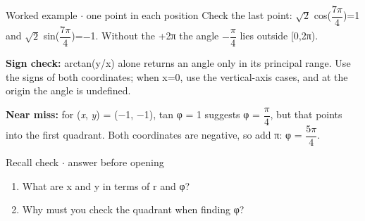 \documentclass[11pt]{article}
\begin{document}
\begin{keepsection}
\begin{workedbox}{Worked example \ensuremath{\cdot} one point in each position}
Check the last point: \ensuremath{\sqrt{2}} cos({\small\ensuremath{\dfrac{7π}{4}}})=1 and \ensuremath{\sqrt{2}} sin({\small\ensuremath{\dfrac{7π}{4}}})=\ensuremath{-}1. Without the +2π the angle \ensuremath{-}{\small\ensuremath{\dfrac{π}{4}}} lies outside [0,2π).
\end{workedbox}

\begin{notebox}\textbf{Sign check:} arctan(y/x) alone returns an angle only in its principal range. Use the signs of both coordinates; when x=0, use the vertical-axis cases, and at the origin the angle is undefined.\end{notebox}

\begin{notebox}\textbf{Near miss:} for (\textit{x}, \textit{y}) = (\ensuremath{-}1, \ensuremath{-}1), tan φ = 1 suggests φ = {\small\ensuremath{\dfrac{π}{4}}}, but that points into the first quadrant. Both coordinates are negative, so add π: φ = {\small\ensuremath{\dfrac{5π}{4}}}.\end{notebox}

\begin{recallbox}{Recall check \ensuremath{\cdot} answer before opening}
\begin{enumerate}
\item What are x and y in terms of r and φ?
\item Why must you check the quadrant when finding φ?
\end{enumerate}

\end{recallbox}
\end{keepsection}
\end{document}
